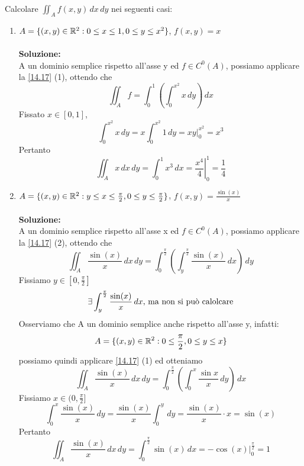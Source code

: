 \begin{example}
  Calcolare $\iint_{A} f(x,y) \,dx \,dy$ nei seguenti casi:
  \begin{enumerate}
    \item $A = \{(x,y)\in\mathbb{R}^2: 0 \leq x \leq 1, 0 \leq y \leq x^2\}$, $ f(x,y) = x$ \\\\
      \textbf{Soluzione:} \\ A \ace un dominio semplice rispetto all'asse y ed $f \in C^0(A)$, possiamo applicare la 
      \ref{14.17} (1), ottendo che 
      $$\iint_{A} f = \int_{0}^{1}\left(\int_{0}^{x^2} x \, dy\right)\,dx$$
      Fissato $x \in [0,1]$,
      $$\int_{0}^{x^2} x \, dy = x \int_{0}^{x^2} 1 \, dy = \left.xy\right|_{0}^{x^2} = x^3$$
      Pertanto 
      $$\iint_{A}x\,dx\,dy = \int_{0}^1 x^3 \,dx = \left.\frac{x^4}{4}\right|_{0}^1 = \frac{1}{4}$$
    \item $A = \{(x,y)\in\mathbb{R}^2: y \leq x \leq \frac{\pi}{2}, 0 \leq y \leq \frac{\pi}{2}\}$, $ f(x,y) = \frac{\sin(x)}{x}$\\\\
      \textbf{Soluzione:} \\
      A \ace un dominio semplice rispetto all'asse x ed $f \in C^0(A)$, possiamo applicare la 
      \ref{14.17} (2), ottendo che
      $$\iint_{A} \frac{\sin(x)}{x} \,dx\,dy = \int_{0}^{\frac{\pi}{2}}\left(\int_{y}^{\frac{\pi}{2}} \frac{\sin(x)}{x} \, dx\right)\,dy$$
      Fissiamo $y \in [0, \frac{\pi}{2}]$
      $$\exists \int_{y}^{\frac{\pi}{2}} \frac{\sin(x)}{x} \, dx \text{, ma non si pu\`o calolcare}$$
      Osserviamo che A \ace un dominio semplice anche rispetto all'asse y, infatti:
      $$A = \{(x,y)\in \mathbb{R}^2 : 0 \leq \frac{\pi}{2}, 0 \leq y \leq x\}$$
      possiamo quindi applicare \ref{14.17} (1) ed otteniamo
      $$\iint_{A} \frac{\sin(x)}{x} \,dx\,dy = \int_{0}^{\frac{\pi}{2}} \left(\int_{0}^{x} \frac{\sin{x}}{x} \,dy\right)\, dx$$
      Fissiamo $x \in (0, \frac{\pi}{2}]$
      $$\int_{0}^x \frac{\sin(x)}{x}\,dy = \frac{\sin(x)}{x}\int_{0}^y \,dy = \frac{\sin(x)}{x} \cdot x = \sin(x)$$
      Pertanto 
      $$\iint_{A} \frac{\sin(x)}{x} \,dx\,dy = \int_{0}^{\frac{\pi}{2}} \sin(x) \,dx = \left.-\cos(x)\right|_{0}^{\frac{\pi}{2}} = 1$$
  \end{enumerate}
\end{example}